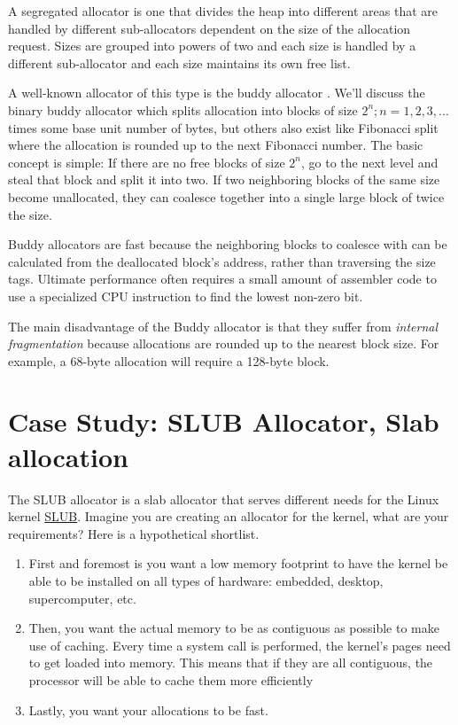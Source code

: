 A segregated allocator is one that divides the heap into different areas that are handled by different sub-allocators dependent on the size of the allocation request.
Sizes are grouped into powers of two and each size is handled by a different sub-allocator and each size maintains its own free list.

A well-known allocator of this type is the buddy allocator \cite[P. 85]{rangan1999foundations}.
We'll discuss the binary buddy allocator which splits allocation into blocks of size $2^n; n = 1, 2, 3, ...$ times some base unit number of bytes, but others also exist like Fibonacci split where the allocation is rounded up to the next Fibonacci number.
The basic concept is simple: If there are no free blocks of size $2^n$, go to the next level and steal that block and split it into two.
If two neighboring blocks of the same size become unallocated, they can coalesce together into a single large block of twice the size.

Buddy allocators are fast because the neighboring blocks to coalesce with can be calculated from the deallocated block's address, rather than traversing the size tags.
Ultimate performance often requires a small amount of assembler code to use a specialized CPU instruction to find the lowest non-zero bit.

The main disadvantage of the Buddy allocator is that they suffer from \emph{internal fragmentation} because allocations are rounded up to the nearest block size.
For example, a 68-byte allocation will require a 128-byte block.

\section{Case Study: SLUB Allocator, Slab allocation}

The SLUB allocator is a slab allocator that serves different needs for the Linux kernel \href{http://en.wikipedia.org/wiki/SLUB_\%28software\%29}{SLUB}.
Imagine you are creating an allocator for the kernel, what are your requirements?
Here is a hypothetical shortlist.

\begin{enumerate}
\item First and foremost is you want a low memory footprint to have the kernel be able to be installed on all types of hardware: embedded, desktop, supercomputer, etc.
\item Then, you want the actual memory to be as contiguous as possible to make use of caching. Every time a system call is performed, the kernel's pages need to get loaded into memory. This means that if they are all contiguous, the processor will be able to cache them more efficiently
\item Lastly, you want your allocations to be fast.
\end{enumerate}


